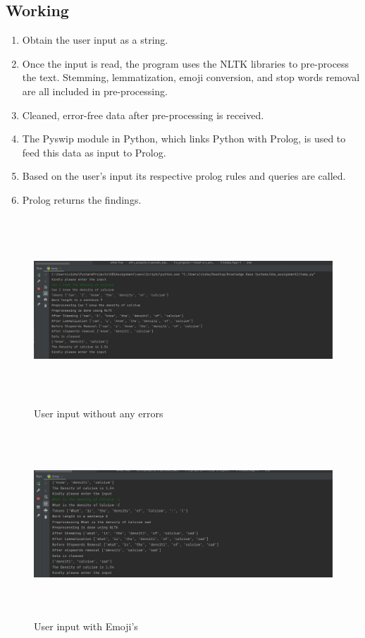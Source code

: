 \documentclass{article}
\begin{document}
\subsection{Working}

\begin{enumerate}
    \item Obtain the user input as a string.
    \item Once the input is read, the program uses the NLTK libraries to pre-process the text. Stemming, lemmatization, emoji conversion, and stop words removal are all included in pre-processing.
    \item Cleaned, error-free data after pre-processing is received.
    \item The Pyswip module in Python, which links Python with Prolog, is used to feed this data as input to Prolog.
    \item Based on the user’s input its respective prolog rules and queries are called.
    \item Prolog returns the findings.
\end{enumerate}


\begin{figure}[htp]
    \centering
    \includegraphics[width=15cm, height = 7cm]{Images/sc-1.jpg}
    \caption{User input without any errors}
    \label{fig:Example 1}
\end{figure}

\begin{figure}[htp]
    \centering
    \includegraphics[width=15cm, height = 7cm]{Images/sc-2.jpg}
    \caption{User input with Emoji's}
    \label{fig:Example 2}
\end{figure}
\end{document}
